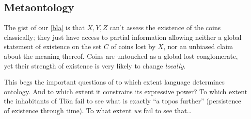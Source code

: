 \subsection{Metaontology} \label{metaon}
The gist of our \autoref{bla} is that $X,Y,Z$ can't assess the existence of the coins classically; they just have access to partial information allowing neither a global statement of existence on the set $C$ of coins lost by $X$, nor an unbiased claim about the meaning thereof. Coins are untouched as a global lost conglomerate, yet their strength of existence is very likely to change \emph{locally}.


This begs the important questions of to which extent language determines ontology. And to which extent it constrains its expressive power? To which extent the inhabitants of Tl\"on fail to see what is exactly ``a topos further'' (persistence of existence through time). To what extent \emph{we} fail to see that\dots



